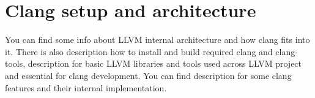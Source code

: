\part{Clang setup and architecture}
You can find some info about LLVM internal architecture and how clang fits into
it. There is also description how to install and build required clang and
clang-tools, description for basic LLVM libraries and tools used across LLVM
project and essential for clang development. You can find description for some
clang features and their internal implementation.




